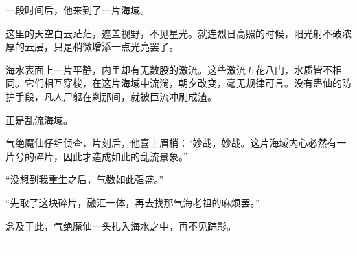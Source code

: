 \begin{this_body}
一段时间后，他来到了一片海域。

这里的天空白云茫茫，遮盖视野，不见星光。就连烈日高照的时候，阳光射不破浓厚的云层，只是稍微增添一点光亮罢了。

海水表面上一片平静，内里却有无数股的激流。这些激流五花八门，水质皆不相同。它们相互穿梭，在这片海域中流淌，朝夕改变，毫无规律可言。没有蛊仙的防护手段，凡人尸躯在刹那间，就被巨流冲刷成渣。

正是乱流海域。

气绝魔仙仔细侦查，片刻后，他喜上眉梢：“妙哉，妙哉。这片海域内心必然有一片兮的碎片，因此才造成如此的乱流景象。”

“没想到我重生之后，气数如此强盛。”

“先取了这块碎片，融汇一体，再去找那气海老祖的麻烦罢。”

念及于此，气绝魔仙一头扎入海水之中，再不见踪影。

------------

\end{this_body}

